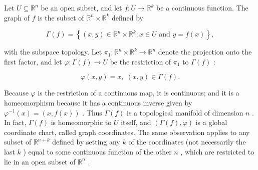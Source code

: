 \begin{example}
\label{ex:1-3}
\leanok
{}
Let $U \subseteq  {\mathbb{R}}^{n}$ be an open subset, and let $f : U \rightarrow  {\mathbb{R}}^{k}$ be a continuous function. The graph of $f$ is the subset of ${\mathbb{R}}^{n} \times  {\mathbb{R}}^{k}$ defined by

\[
\Gamma \left( f\right)  = \left\{  {\left( {x, y}\right)  \in  {\mathbb{R}}^{n} \times  {\mathbb{R}}^{k} : x \in  U\text{ and }y = f\left( x\right) }\right\}  ,
\]

with the subspace topology. Let ${\pi }_{1} : {\mathbb{R}}^{n} \times  {\mathbb{R}}^{k} \rightarrow  {\mathbb{R}}^{n}$ denote the projection onto the first factor, and let $\varphi  : \Gamma \left( f\right)  \rightarrow  U$ be the restriction of ${\pi }_{1}$ to $\Gamma \left( f\right)$ :

\[
\varphi \left( {x, y}\right)  = x,\;\left( {x, y}\right)  \in  \Gamma \left( f\right) .
\]

Because $\varphi$ is the restriction of a continuous map, it is continuous; and it is a homeomorphism because it has a continuous inverse given by ${\varphi }^{-1}\left( x\right)  = \left( {x, f\left( x\right) }\right)$ . Thus $\Gamma \left( f\right)$ is a topological manifold of dimension $n$ . In fact, $\Gamma \left( f\right)$ is homeomorphic to $U$ itself, and $\left( {\Gamma \left( f\right) ,\varphi }\right)$ is a global coordinate chart, called graph coordinates. The same observation applies to any subset of ${\mathbb{R}}^{n + k}$ defined by setting any $k$ of the coordinates (not necessarily the last $k$ ) equal to some continuous function of the other $n$ , which are restricted to lie in an open subset of ${\mathbb{R}}^{n}$ .
\end{example}

